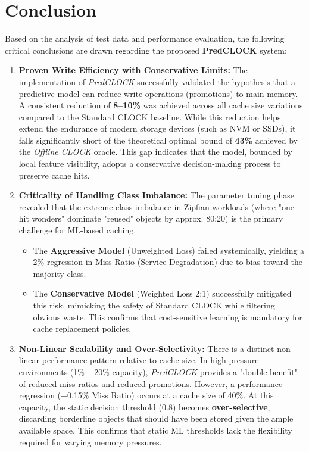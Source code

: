 \section{Conclusion}
\label{sec:conclusion}

Based on the analysis of test data and performance evaluation, the
following critical conclusions are drawn regarding the proposed
\textbf{PredCLOCK} system:

\begin{enumerate}
  \item \textbf{Proven Write Efficiency with Conservative Limits:}
    The implementation of \textit{PredCLOCK} successfully validated
    the hypothesis that a predictive model can reduce write
    operations (promotions) to main memory. A consistent reduction of
    \textbf{8--10\%} was achieved across all cache size variations
    compared to the Standard CLOCK baseline.
    While this reduction helps extend the endurance of modern storage
    devices (such as NVM or SSDs), it falls significantly short of
    the theoretical optimal bound of \textbf{43\%} achieved by the
    \textit{Offline CLOCK} oracle. This gap indicates that the model,
    bounded by local feature visibility, adopts a conservative
    decision-making process to preserve cache hits.

  \item \textbf{Criticality of Handling Class Imbalance:}
    The parameter tuning phase revealed that the extreme class
    imbalance in Zipfian workloads (where "one-hit wonders" dominate
    "reused" objects by approx. 80:20) is the primary challenge for
    ML-based caching.
    \begin{itemize}
      \item The \textbf{Aggressive Model} (Unweighted Loss) failed
        systemically, yielding a 2\% regression in Miss Ratio
        (Service Degradation) due to bias toward the majority class.
      \item The \textbf{Conservative Model} (Weighted Loss 2:1)
        successfully mitigated this risk, mimicking the safety of
        Standard CLOCK while filtering obvious waste. This confirms
        that cost-sensitive learning is mandatory for cache
        replacement policies.
    \end{itemize}

  \item \textbf{Non-Linear Scalability and Over-Selectivity:}
    There is a distinct non-linear performance pattern relative to
    cache size. In high-pressure environments (1\% -- 20\% capacity),
    \textit{PredCLOCK} provides a "double benefit" of reduced miss
    ratios and reduced promotions. However, a performance regression
    (+0.15\% Miss Ratio) occurs at a cache size of 40\%. At this
    capacity, the static decision threshold (0.8) becomes
    \textbf{over-selective}, discarding borderline objects that
    should have been stored given the ample available space. This
    confirms that static ML thresholds lack the flexibility required
    for varying memory pressures.


\end{enumerate}
